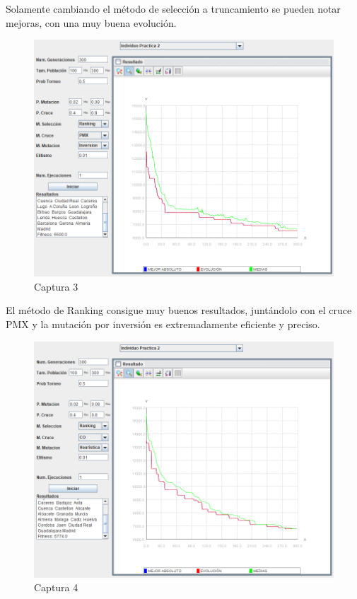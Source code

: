 \documentclass[twoside]{AiTeX}
\begin{document}
Solamente cambiando el método de selección a truncamiento se pueden notar mejoras, con una muy buena evolución.

\begin{figure}[H]
    \centering
    \includegraphics[width = \textwidth]{Images/Captura3.png}
    \caption{Captura 3}
    \label{fig:3}
\end{figure}

El método de Ranking consigue muy buenos resultados, juntándolo con el cruce PMX y la mutación por inversión es extremadamente eficiente y preciso.

\begin{figure}[H]
    \centering
    \includegraphics[width = \textwidth]{Images/Captura4.png}
    \caption{Captura 4}
    \label{fig:4}
\end{figure}
\end{document}
